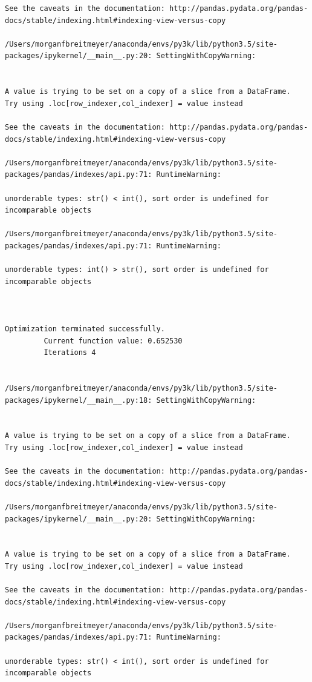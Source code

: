 \begin{lstlisting}
See the caveats in the documentation: http://pandas.pydata.org/pandas-docs/stable/indexing.html#indexing-view-versus-copy

/Users/morganfbreitmeyer/anaconda/envs/py3k/lib/python3.5/site-packages/ipykernel/__main__.py:20: SettingWithCopyWarning:


A value is trying to be set on a copy of a slice from a DataFrame.
Try using .loc[row_indexer,col_indexer] = value instead

See the caveats in the documentation: http://pandas.pydata.org/pandas-docs/stable/indexing.html#indexing-view-versus-copy

/Users/morganfbreitmeyer/anaconda/envs/py3k/lib/python3.5/site-packages/pandas/indexes/api.py:71: RuntimeWarning:

unorderable types: str() < int(), sort order is undefined for incomparable objects

/Users/morganfbreitmeyer/anaconda/envs/py3k/lib/python3.5/site-packages/pandas/indexes/api.py:71: RuntimeWarning:

unorderable types: int() > str(), sort order is undefined for incomparable objects



Optimization terminated successfully.
         Current function value: 0.652530
         Iterations 4


/Users/morganfbreitmeyer/anaconda/envs/py3k/lib/python3.5/site-packages/ipykernel/__main__.py:18: SettingWithCopyWarning:


A value is trying to be set on a copy of a slice from a DataFrame.
Try using .loc[row_indexer,col_indexer] = value instead

See the caveats in the documentation: http://pandas.pydata.org/pandas-docs/stable/indexing.html#indexing-view-versus-copy

/Users/morganfbreitmeyer/anaconda/envs/py3k/lib/python3.5/site-packages/ipykernel/__main__.py:20: SettingWithCopyWarning:


A value is trying to be set on a copy of a slice from a DataFrame.
Try using .loc[row_indexer,col_indexer] = value instead

See the caveats in the documentation: http://pandas.pydata.org/pandas-docs/stable/indexing.html#indexing-view-versus-copy

/Users/morganfbreitmeyer/anaconda/envs/py3k/lib/python3.5/site-packages/pandas/indexes/api.py:71: RuntimeWarning:

unorderable types: str() < int(), sort order is undefined for incomparable objects


\end{lstlisting}
